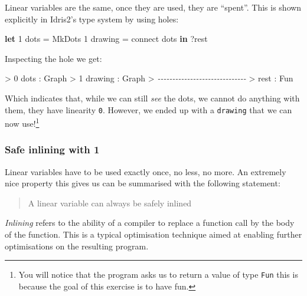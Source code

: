 \documentclass[
]{article}
\newenvironment{Shaded}{}{}
\newcommand{\CommentTok}[1]{\textcolor[rgb]{0.38,0.63,0.69}{\textit{#1}}}
\newcommand{\DataTypeTok}[1]{\textcolor[rgb]{0.56,0.13,0.00}{#1}}
\newcommand{\DecValTok}[1]{\textcolor[rgb]{0.25,0.63,0.44}{#1}}
\newcommand{\KeywordTok}[1]{\textcolor[rgb]{0.00,0.44,0.13}{\textbf{#1}}}
\newcommand{\NormalTok}[1]{#1}
\newcommand{\OperatorTok}[1]{\textcolor[rgb]{0.40,0.40,0.40}{#1}}
\newcommand{\OtherTok}[1]{\textcolor[rgb]{0.00,0.44,0.13}{#1}}
\begin{document}
Linear variables are the same, once they are used, they are ``spent''.
This is shown explicitly in Idris2's type system by using holes:

\begin{Shaded}
\begin{Highlighting}[]
\KeywordTok{let} \DecValTok{1}\NormalTok{ dots }\OtherTok{=} \DataTypeTok{MkDots}
    \DecValTok{1}\NormalTok{ drawing }\OtherTok{=}\NormalTok{ connect dots }\KeywordTok{in}
    \OperatorTok{?}\NormalTok{rest}
\end{Highlighting}
\end{Shaded}

Inspecting the hole we get:

\begin{Shaded}
\begin{Highlighting}[]
\OperatorTok{\textgreater{}}  \DecValTok{0}\NormalTok{ dots }\OperatorTok{:} \DataTypeTok{Graph}
\OperatorTok{\textgreater{}}  \DecValTok{1}\NormalTok{ drawing }\OperatorTok{:} \DataTypeTok{Graph}
\OperatorTok{\textgreater{}} \CommentTok{{-}{-}{-}{-}{-}{-}{-}{-}{-}{-}{-}{-}{-}{-}{-}{-}{-}{-}{-}{-}{-}{-}{-}{-}{-}{-}{-}{-}{-}{-}}
\OperatorTok{\textgreater{}}\NormalTok{ rest }\OperatorTok{:} \DataTypeTok{Fun}
\end{Highlighting}
\end{Shaded}

Which indicates that, while we can still \emph{see} the dots, we cannot
do anything with them, they have linearity \texttt{0}. However, we ended
up with a \texttt{drawing} that we can now use!\footnote{You will notice
  that the program asks us to return a value of type \texttt{Fun} this
  is because the goal of this exercise is to have fun.}

\hypertarget{safe-inlining-with-1}{%
\subsubsection{Safe inlining with 1}\label{safe-inlining-with-1}}

Linear variables have to be used exactly once, no less, no more. An
extremely nice property this gives us can be summarised with the
following statement:

\begin{quote}
A linear variable can always be safely inlined
\end{quote}

\emph{Inlining} refers to the ability of a compiler to replace a
function call by the body of the function. This is a typical
optimisation technique aimed at enabling further optimisations on the
resulting program.
\end{document}
